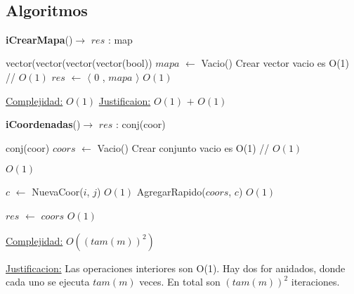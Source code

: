 $ $\newline
$ $\newline

\begin{Algoritmos}
\subsection{Algoritmos}

\begin{algorithm}[H]
{\textbf{iCrearMapa}()$\to$ $res$ : map}
\begin{algorithmic}[1]
   
\State vector(vector(vector(vector(bool)) $mapa$ $\gets$ Vacio()    \Comment Crear vector vacio es O(1) // $O(1)$
\State $res$ $\gets$  $\langle$ 0 , $mapa$ $\rangle$   \Comment $O(1)$

\medskip
\Statex \underline{Complejidad:} $O(1)$
\State \underline{Justificaion:} $O(1)$ $+$ $O(1)$

\end{algorithmic}
\end{algorithm}

\begin{algorithm}[H]
{\textbf{iCoordenadas}()$\to$ $res$ : conj(coor)}
\begin{algorithmic}[1]
   

\State conj(coor) $coors$ $\gets$ Vacio()      \Comment Crear conjunto vacio es O(1) // $O(1)$

	
		
		  \Comment $O(1)$
			
			\State $c$ $\gets$ NuevaCoor($i$, $j$)   \Comment $O(1)$			
			\State AgregarRapido($coors$, $c$)   \Comment $O(1)$			
			
		\EndIf
		
	\EndFor

\EndFor

\State $res$ $\gets$ $coors$ \Comment $O(1)$


\medskip
\Statex \underline{Complejidad:} $O((tam(m))^2)$

\Statex \underline{Justificacion:} Las operaciones interiores son O(1). Hay dos for anidados, donde cada uno se ejecuta $tam(m)$ veces. En total son $(tam(m))^2$ iteraciones. 

\end{algorithmic}
\end{algorithm}


\end{Algoritmos}
